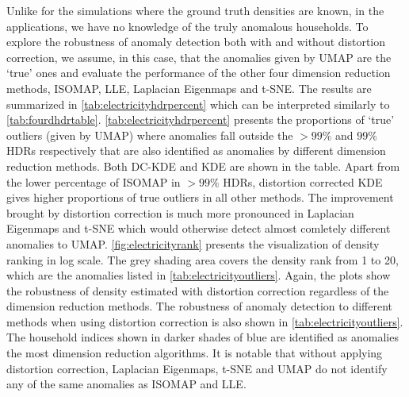 \documentclass[11pt,a4paper,]{article}
\begin{document}
Unlike for the simulations where the ground truth densities are known, in the applications, we have no knowledge of the truly anomalous households. To explore the robustness of anomaly detection both with and without distortion correction, we assume, in this case, that the anomalies given by UMAP are the `true' ones and evaluate the performance of the other four dimension reduction methods, ISOMAP, LLE, Laplacian Eigenmaps and t-SNE. The results are summarized in \autoref{tab:electricityhdrpercent} which can be interpreted similarly to \autoref{tab:fourdhdrtable}. \autoref{tab:electricityhdrpercent} presents the proportions of `true' outliers (given by UMAP) where anomalies fall outside the \(>99\%\) and \(99\%\) HDRs respectively that are also identified as anomalies by different dimension reduction methods. Both DC-KDE and KDE are shown in the table. Apart from the lower percentage of ISOMAP in \(>99\%\) HDRs, distortion corrected KDE gives higher proportions of true outliers in all other methods. The improvement brought by distortion correction is much more pronounced in Laplacian Eigenmaps and t-SNE which would otherwise detect almost comletely different anomalies to UMAP. \autoref{fig:electricityrank} presents the visualization of density ranking in log scale. The grey shading area covers the density rank from 1 to 20, which are the anomalies listed in \autoref{tab:electricityoutliers}. Again, the plots show the robustness of density estimated with distortion correction regardless of the dimension reduction methods. The robustness of anomaly detection to different methods when using distortion correction is also shown in \autoref{tab:electricityoutliers}. The household indices shown in darker shades of blue are identified as anomalies the most dimension reduction algorithms. It is notable that without applying distortion correction, Laplacian Eigenmaps, t-SNE and UMAP do not identify any of the same anomalies as ISOMAP and LLE.
\end{document}
